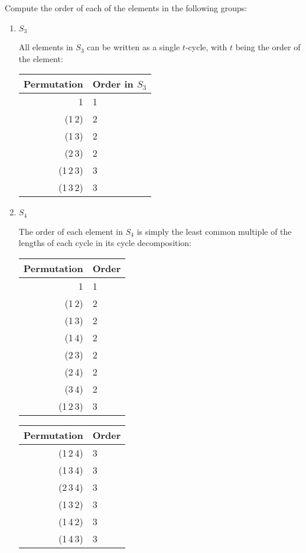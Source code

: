  Compute the order of each of the elements in the following
groups:
\label{exercise-order-s3-and-s4-elements}
\begin{enumerate}
\item $S_3$
  \begin{solution}
    All elements in $S_3$ can be written as a single $t$-cycle, with
    $t$ being the order of the element:
    \begin{center}
      \begin{tabular}{r|l}
        Permutation & Order in $S_3$ \\\hline
        1 & 1 \\
        (1\,2) & 2 \\
        (1\,3) & 2 \\
        (2\,3) & 2 \\
        (1\,2\,3) & 3 \\
        (1\,3\,2) & 3
      \end{tabular}
    \end{center}
  \end{solution}
\item $S_4$
  \begin{solution}
    The order of each element in $S_4$ is simply the least common
    multiple of the lengths of each cycle in its cycle decomposition:
    \begin{center}
      \begin{tabular}{r|l}
        Permutation & Order \\\hline
        1 & 1 \\
        (1\,2) & 2 \\
        (1\,3) & 2 \\
        (1\,4) & 2 \\
        (2\,3) & 2 \\
        (2\,4) & 2 \\
        (3\,4) & 2 \\
        (1\,2\,3) & 3
      \end{tabular}
      \begin{tabular}{r|l}
        Permutation & Order \\\hline
        (1\,2\,4) & 3 \\
        (1\,3\,4) & 3 \\
        (2\,3\,4) & 3 \\
        (1\,3\,2) & 3 \\
        (1\,4\,2) & 3 \\
        (1\,4\,3) & 3 \\

\end{tabular}
\end{center}
\end{solution}
\end{enumerate}
